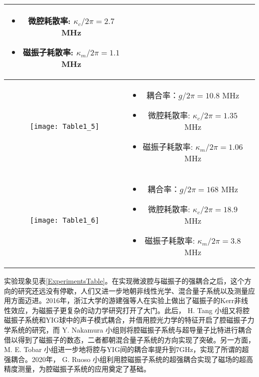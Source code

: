 \begin{center}
\begin{tabular}{ccc}
\begin{minipage}[m]{.5\textwidth}
\begin{itemize}
				\item 微腔耗散率: $\kappa_c /2\pi=2.7$ MHz
				\item 磁振子耗散率: $\kappa_m /2\pi=1.1$ MHz
			\end{itemize}
		\end{minipage} &
		\parencite{PhysRevLett.113.083603Nakamura} \\
		\hline
		\begin{minipage}[m]{.3\textwidth}\centering\vspace*{5pt}
			\texttt{[image: Table1\_5]}\vspace*{5pt}
		\end{minipage} &
		\begin{minipage}[m]{.5\textwidth}
			\begin{itemize}
				\item 耦合率：$g/2\pi=10.8$ MHz
				\item 微腔耗散率: $\kappa_c /2\pi=1.35$ MHz
				\item 磁振子耗散率: $\kappa_m /2\pi=1.06$ MHz
			\end{itemize}
		\end{minipage} &
		\parencite{PhysRevLett.113.156401Tang} \\
		\hline
		\begin{minipage}[m]{.3\textwidth}\centering\vspace*{5pt}
			\texttt{[image: Table1\_6]}\vspace*{5pt}
		\end{minipage} &
		\begin{minipage}[m]{.5\textwidth}
			\begin{itemize}
				\item 耦合率：$g/2\pi=168$ MHz
				\item 微腔耗散率: $\kappa_c /2\pi=18.9$ MHz
				\item 磁振子耗散率: $\kappa_m /2\pi=3.8$ MHz
			\end{itemize}
		\end{minipage} &
		\parencite{PhysRevLett.114.227201Hu} \\
		\bottomrule
	\end{tabular}
\end{center}
实验现象见表\ref{ExperimentsTable}。在实现微波腔与磁振子的强耦合之后，这个方向的研究还远没有停歇，人们又进一步地朝非线性光学、混合量子系统以及测量应用方面迈进。2016年，浙江大学的游建强等人在实验上做出了磁振子的Kerr非线性效应\cite{PhysRevB.94.224410You}，为磁振子更复杂的动力学研究打开了大门。此后， H. Tang 小组又将腔磁振子系统和YIG球中的声子模式耦合\cite{10.1126/sciadv.1501286Tang}，并借用腔光力学的特征开启了腔磁振子力学系统的研究，而 Y. Nakamura 小组则将腔磁振子系统与超导量子比特进行耦合借以得到了磁振子的数态\cite{10.1126/sciadv.1603150Nakamura}，二者都朝混合量子系统的方向实现了突破。另一方面， M. E. Tobar 小组进一步地将腔与YIG间的耦合率提升到7GHz，实现了所谓的超强耦合\cite{PhysRevB.93.144420Tobar}。2020年， G. Ruoso 小组利用腔磁振子系统的超强耦合实现了磁场的超高精度测量\cite{10.1063/5.0024369Ruoso}，为腔磁振子系统的应用奠定了基础。

